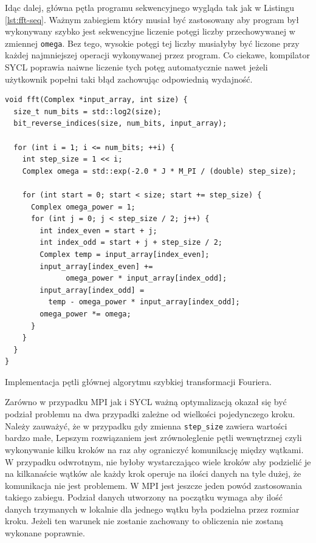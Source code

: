 \documentclass[a4paper,12pt]{book} %
\begin{document}
Idąc dalej, główna pętla programu sekwencyjnego wygląda tak jak w Listingu \ref{lst:fft-seq}. Ważnym zabiegiem który musiał być zastosowany aby program był wykonywany szybko jest sekwencyjne liczenie potęgi liczby przechowywanej w zmiennej \texttt{omega}. Bez tego, wysokie potęgi tej liczby musiałyby być liczone przy każdej najmniejszej operacji wykonywanej przez program. Co ciekawe, kompilator SYCL poprawia naiwne liczenie tych potęg automatycznie nawet jeżeli użytkownik popełni taki błąd zachowując odpowiednią wydajność.

\begin{lstfloat}
\lstset{language=C++}
\begin{lstlisting}[frame=single]
void fft(Complex *input_array, int size) {
  size_t num_bits = std::log2(size);
  bit_reverse_indices(size, num_bits, input_array);

  for (int i = 1; i <= num_bits; ++i) {
    int step_size = 1 << i;
    Complex omega = std::exp(-2.0 * J * M_PI / (double) step_size);

    for (int start = 0; start < size; start += step_size) {
      Complex omega_power = 1;
      for (int j = 0; j < step_size / 2; j++) {
        int index_even = start + j;
        int index_odd = start + j + step_size / 2;
        Complex temp = input_array[index_even];
        input_array[index_even] += 
        	  omega_power * input_array[index_odd];
        input_array[index_odd] = 
          temp - omega_power * input_array[index_odd];
        omega_power *= omega;
      }
    }
  }
}

\end{lstlisting}
\caption{Implementacja pętli głównej algorytmu szybkiej transformacji Fouriera.}
\label{lst:fft-seq}
\end{lstfloat}

Zarówno w przypadku MPI jak i SYCL ważną optymalizacją okazał się być podział problemu na dwa przypadki zależne od wielkości pojedynczego kroku. Należy zauważyć, że w przypadku gdy zmienna \texttt{step\_size} zawiera wartości bardzo małe, Lepszym rozwiązaniem jest zrównoleglenie pętli wewnętrznej czyli wykonywanie kilku kroków na raz aby ograniczyć komunikację między wątkami. W przypadku odwrotnym, nie byłoby wystarczająco wiele kroków aby podzielić je na kilkanaście wątków ale każdy krok operuje na ilości danych na tyle dużej, że komunikacja nie jest problemem. W MPI jest jeszcze jeden powód zastosowania takiego zabiegu. Podział danych utworzony na początku wymaga aby ilość danych trzymanych w lokalnie dla jednego wątku była podzielna przez rozmiar kroku. Jeżeli ten warunek nie zostanie zachowany to obliczenia nie zostaną wykonane poprawnie.
\end{document}
